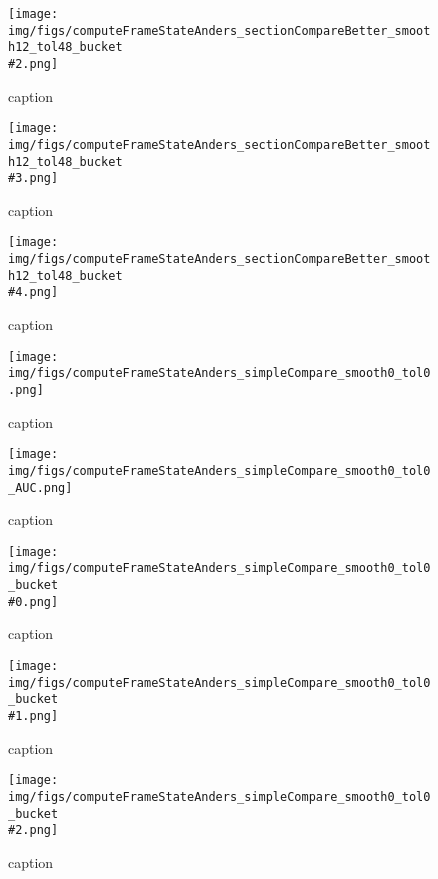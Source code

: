 %
\begin{figure}[!ht]
	\centering
	\texttt{[image: img/figs/computeFrameStateAnders\_sectionCompareBetter\_smooth12\_tol48\_bucket\\\#2.png]}
	\caption{caption}
	\label{fig:computeFrameStateAnders_sectionCompareBetter_smooth12_tol48_bucket\#2.png}
\end{figure}
%
\begin{figure}[!ht]
	\centering
	\texttt{[image: img/figs/computeFrameStateAnders\_sectionCompareBetter\_smooth12\_tol48\_bucket\\\#3.png]}
	\caption{caption}
	\label{fig:computeFrameStateAnders_sectionCompareBetter_smooth12_tol48_bucket\#3.png}
\end{figure}
%
\begin{figure}[!ht]
	\centering
	\texttt{[image: img/figs/computeFrameStateAnders\_sectionCompareBetter\_smooth12\_tol48\_bucket\\\#4.png]}
	\caption{caption}
	\label{fig:computeFrameStateAnders_sectionCompareBetter_smooth12_tol48_bucket\#4.png}
\end{figure}
%
\begin{figure}[!ht]
	\centering
	\texttt{[image: img/figs/computeFrameStateAnders\_simpleCompare\_smooth0\_tol0.png]}
	\caption{caption}
	\label{fig:computeFrameStateAnders_simpleCompare_smooth0_tol0.png}
\end{figure}
%
\begin{figure}[!ht]
	\centering
	\texttt{[image: img/figs/computeFrameStateAnders\_simpleCompare\_smooth0\_tol0\_AUC.png]}
	\caption{caption}
	\label{fig:computeFrameStateAnders_simpleCompare_smooth0_tol0_AUC.png}
\end{figure}
%
\begin{figure}[!ht]
	\centering
	\texttt{[image: img/figs/computeFrameStateAnders\_simpleCompare\_smooth0\_tol0\_bucket\\\#0.png]}
	\caption{caption}
	\label{fig:computeFrameStateAnders_simpleCompare_smooth0_tol0_bucket\#0.png}
\end{figure}
%
\begin{figure}[!ht]
	\centering
	\texttt{[image: img/figs/computeFrameStateAnders\_simpleCompare\_smooth0\_tol0\_bucket\\\#1.png]}
	\caption{caption}
	\label{fig:computeFrameStateAnders_simpleCompare_smooth0_tol0_bucket\#1.png}
\end{figure}
%
\begin{figure}[!ht]
	\centering
	\texttt{[image: img/figs/computeFrameStateAnders\_simpleCompare\_smooth0\_tol0\_bucket\\\#2.png]}
	\caption{caption}
	\label{fig:computeFrameStateAnders_simpleCompare_smooth0_tol0_bucket\#2.png}
\end{figure}
